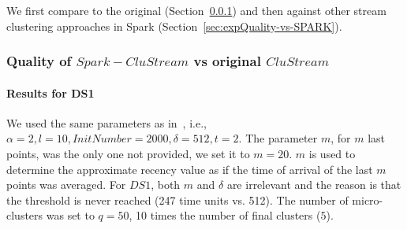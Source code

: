We first compare \our to the original \clustream (Section~\ref{sec:expQuality-vs-CluStream}) and then against other stream clustering approaches in Spark (Section~\ref{sec:expQuality-vs-SPARK}).

\subsubsection{Quality of $Spark-CluStream$ vs original $CluStream$}
\label{sec:expQuality-vs-CluStream}
\paragraph{Results for DS1}

We used the same parameters as in~\cite{clustreamOrig}, i.e., $\alpha=2,l=10,InitNumber=2000,\delta=512,t=2$.
The parameter $m$, for $m$ last points, was the only one not provided, we set it to $m=20$. $m$ is used to determine the approximate recency value as if the time of arrival of the last $m$ points was averaged.
For $DS1$, both $m$ and $\delta$ are irrelevant and the reason is that the threshold is never reached (247 time units vs. 512). 
The number of micro-clusters was set to $q=50$, 10 times the number of final clusters ($5$). 

